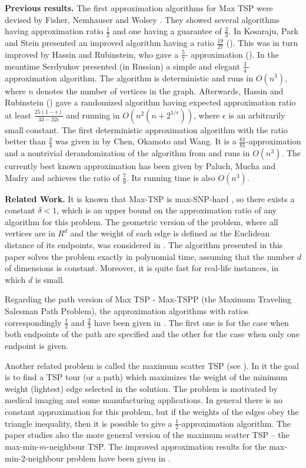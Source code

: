 \documentclass[a4, 11pt]{article}
\newcommand{\eps}{\epsilon}
\newcommand{\<}{\langle}
\renewcommand{\>}{\rangle}
\begin{document}
{\bf Previous results.}  The first approximation algorithms for Max TSP were devised by Fisher, Nemhauser and Wolsey \cite{Fish}. They showed several algorithms having approximation ratio $\frac {1}{2}$
and  one  having a guarantee of $\frac{2}{3}$. In \cite{Kos} Kosaraju, Park and Stein  presented an improved algorithm having a  ratio $\frac{19}{27}$  (\cite{BH}). This was in turn improved by Hassin and Rubinstein, who gave a $\frac 57$- approximation (\cite{HR1}).
In the meantime  Serdyukov \cite{Ser} presented (in Russian) a simple and elegant $\frac{3}{4}$-approximation algorithm. The algorithm
is deterministic and runs in $O(n^3)$, where $n$ denotes the number of vertices in the graph.
Afterwards, Hassin and Rubinstein (\cite{HR}) gave a randomized algorithm having  expected approximation ratio at least $\frac{25(1-\eps)}{33-32\eps}$  and running in $O(n^2(n+2^{1/\eps}))$, where $\eps$ is an arbitrarily small constant.
The first deterministic approximation algorithm with the ratio
better than $\frac{3}{4}$ was given in \cite{Chen} by Chen, Okamoto and  Wang. It is a $\frac{61}{81}$-approximation and a nontrivial derandomization of the algorithm from \cite{HR} and runs in $O(n^3)$. The currently best known approximation has been given by Paluch, Mucha and Madry \cite{Paluch}  and achieves the ratio of $\frac 79$. Its running time  is also $O(n^3)$.

{\bf Related Work.} It is known that Max-TSP  is max-SNP-hard \cite{bgww}, so there exists a constant $\delta < 1$, which is an upper bound on the approximation ratio of any algorithm for this problem. The geometric version of the problem, where all vertices are in $R^d$ and the  weight of each edge is defined as the Euclidean distance of its endpoints, was considered in \cite{g_maxtsp}. The algorithm presented in this paper solves the problem exactly in polynomial time, assuming that the number $d$ of dimensions is constant. Moreover, it is quite fast for real-life instances, in which $d$ is small. 

Regarding the path version of Max TSP - Max-TSPP (the Maximum Traveling Salesman Path Problem), the approximation algorithms with ratios correspondingly $\frac 12$ and $\frac 23$ have been given in \cite{Monnot}. The first one is for the case when both endpoints of the path are specified and the other for the case when only one endpoint is given.

Another related problem is called the maximum scatter TSP (see \cite{arkin}). In it the goal is to find a TSP tour (or a path) which maximizes the weight of the minimum weight (lightest) edge selected in the solution. The problem is motivated by medical imaging and some manufacturing applications.  In general there is no constant approximation for this problem, but if  the weights of the edges obey the triangle inequality, then it is possible to give a $\frac{1}{2}$-approximation  algorithm. The paper studies also the more general version of the maximum scatter TSP -- the max-min-$m$-neighbour TSP. The improved approximation results  for the max-min-$2$-neighbour problem have been given in \cite{Chiang}.
\end{document}
